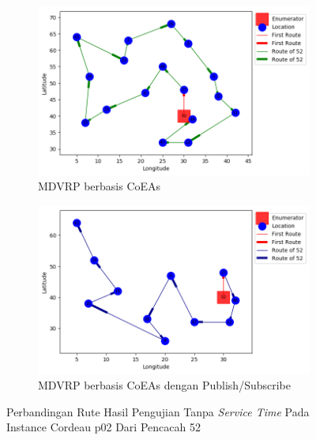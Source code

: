 \begin{figure}[H]
	\centering
	\begin{subfigure}[t]{\textwidth}
		\centering
		\includegraphics[width=\textwidth]{Resources/Images/cordeau_p02/cordeau_p02_notw_52_coes}
		\caption{MDVRP berbasis CoEAs}
		\label{fig:cordeau_p02_notw_52_coes}
	\end{subfigure}
	\begin{subfigure}[t]{\textwidth}
		\centering
		\includegraphics[width=\textwidth]{Resources/Images/cordeau_p02/cordeau_p02_notw_52_pubsub_coes}
		\caption{MDVRP berbasis CoEAs dengan Publish/Subscribe}
		\label{fig:cordeau_p02_notw_52_pubsub_coes}
	\end{subfigure}
	\caption{Perbandingan Rute Hasil Pengujian Tanpa \textit{Service Time} Pada Instance Cordeau p02 Dari Pencacah 52}
	\label{fig:cordeau_p02_notw_52}
\end{figure}


